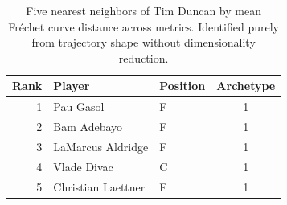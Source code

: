 \begin{table}[htbp]
  \centering\small
  \begin{tabular}{rllc}
    \toprule
    Rank & Player & Position & Archetype \\
    \midrule
    1 & Pau Gasol & F & 1 \\
    2 & Bam Adebayo & F & 1 \\
    3 & LaMarcus Aldridge & F & 1 \\
    4 & Vlade Divac & C & 1 \\
    5 & Christian Laettner & F & 1 \\
    \bottomrule
  \end{tabular}
  \caption{Five nearest neighbors of Tim Duncan by mean Fr\'{e}chet curve distance across metrics. Identified purely from trajectory shape without dimensionality reduction.}
  \label{tab:Tim_Duncan_frechet_curve_neighbors}
\end{table}

